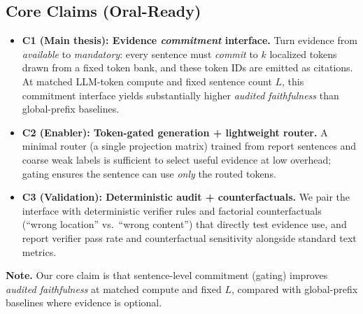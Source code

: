 \documentclass[11pt,a4paper]{article}
\begin{document}
\subsection{Core Claims (Oral-Ready)}
\begin{itemize}[nosep]
\item \textbf{C1 (Main thesis): Evidence \emph{commitment} interface.}
Turn evidence from \emph{available} to \emph{mandatory}: every sentence must \emph{commit} to $k$ localized tokens drawn from a fixed token bank, and these token IDs are emitted as citations.
At matched LLM-token compute and fixed sentence count $L$, this commitment interface yields substantially higher \emph{audited faithfulness} than global-prefix baselines.
\item \textbf{C2 (Enabler): Token-gated generation + lightweight router.}
A minimal router (a single projection matrix) trained from report sentences and coarse weak labels is sufficient to select useful evidence at low overhead; gating ensures the sentence can use \emph{only} the routed tokens.
\item \textbf{C3 (Validation): Deterministic audit + counterfactuals.}
We pair the interface with deterministic verifier rules and factorial counterfactuals (``wrong location'' vs.\ ``wrong content'') that directly test evidence use, and report verifier pass rate and counterfactual sensitivity alongside standard text metrics.
\end{itemize}

\noindent\textbf{Note.}
Our core claim is that sentence-level commitment (gating) improves \emph{audited faithfulness} at matched compute and fixed $L$, compared with global-prefix baselines where evidence is optional.
\end{document}
